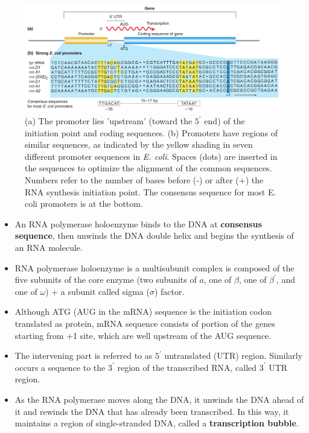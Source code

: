 \documentclass[11pt,ignorenonframetext,aspectratio=169]{beamer}
\providecommand{\tightlist}{%
  \setlength{\itemsep}{0pt}\setlength{\parskip}{0pt}}
\begin{document}
\begin{frame}{}
\protect\hypertarget{section-21}{}
\begin{figure}
\includegraphics[width=0.72\linewidth]{../images/gene_transcription} \caption{(a) The promoter lies 'upstream' (toward the $5^\prime$ end) of the initiation point and coding sequences. (b) Promoters have regions of similar sequences, as indicated by the yellow shading in seven different promoter sequences in \textit{E. coli}. Spaces (dots) are inserted in the sequences to optimize the alignment of the common sequences. Numbers refer to the number of bases before (-) or after (+) the RNA synthesis initiation point. The consensus sequence for most E. coli promoters is at the bottom.}\label{fig:gene-transcription}
\end{figure}
\end{frame}

\begin{frame}{}
\protect\hypertarget{section-22}{}
\begin{itemize}
\tightlist
\item
  An RNA polymerase holoenzyme binds to the DNA at \textbf{consensus
  sequence}, then unwinds the DNA double helix and begins the synthesis
  of an RNA molecule.
\item
  RNA polymerase holoenzyme is a multisubunit complex is composed of the
  five subunits of the core enzyme (two subunits of \(a\), one of
  \(\beta\), one of \(\beta^\prime\), and one of \(\omega\)) + a subunit
  called sigma (\(\sigma\)) factor.
\item
  Although ATG (AUG in the mRNA) sequence is the initiation codon
  translated as protein, mRNA sequence consists of portion of the genes
  starting from +1 site, which are well upstream of the AUG sequence.
\item
  The intervening part is referred to as \(5^\prime\) untranslated (UTR)
  region. Similarly occurs a sequence to the \(3^\prime\) region of the
  transcribed RNA, called \(3^\prime\) UTR region.
\item
  As the RNA polymerase moves along the DNA, it unwinds the DNA ahead of
  it and rewinds the DNA that has already been transcribed. In this way,
  it maintains a region of single-stranded DNA, called a
  \textbf{transcription bubble}.
\end{itemize}
\end{frame}
\end{document}
